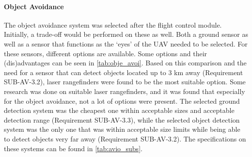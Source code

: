 





\paragraph{Object Avoidance} The object avoidance system was selected after the flight control module. Initially, a trade-off would be performed on these as well. Both a ground sensor as well as a sensor that functions as the `eyes' of the UAV needed to be selected. For these sensors, different options are available. Some options and their (dis)advantages can be seen in \autoref{tab:obje_avoi}. Based on this comparison and the need for a sensor that can detect objects located up to 3 km away (Requirement SUB-AV-3.2), laser rangefinders were found to be the most suitable option. Some research was done on suitable laser rangefinders, and it was found that especially for the object avoidance, not a lot of options were present. The selected ground detection system was the cheapest one within  acceptable sizes and acceptable detection range (Requirement SUB-AV-3.3), while the selected object detection system was the only one that was within acceptable size limits while being able to detect objects very far away (Requirement SUB-AV-3.2). The specifications on these systems can be found in \autoref{tab:avio_subs}.



